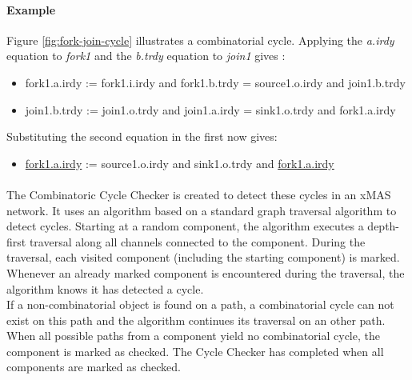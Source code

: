 \documentclass[a4paper,11pt]{article}
\begin{document}
\paragraph{Example}
Figure \ref{fig:fork-join-cycle} illustrates a combinatorial cycle. Applying the \emph{a.irdy} equation
to \emph{fork1} and the \emph{b.trdy} equation to \emph{join1} gives \cite[p.~44]{chatterjee10}:
\begin{itemize}
 \item fork1.a.irdy := fork1.i.irdy and fork1.b.trdy = source1.o.irdy and join1.b.trdy
 \item join1.b.trdy := join1.o.trdy and join1.a.irdy = sink1.o.trdy and fork1.a.irdy
\end{itemize}
Substituting the second equation in the first now gives:
\begin{itemize}
 \item \underline{fork1.a.irdy} := source1.o.irdy and sink1.o.trdy and \underline{fork1.a.irdy}
\end{itemize}







\paragraph{}
The Combinatoric Cycle Checker is created to detect these cycles in an xMAS network. It uses an
algorithm based on a standard graph traversal algorithm to detect cycles. Starting at a random
component, the algorithm executes a depth-first traversal along all channels connected to the
component. During the traversal, each visited component (including the starting component) is
marked. Whenever an already marked component is encountered during the traversal, the algorithm
knows it has detected a cycle.\\
If a non-combinatorial object is found on a path, a combinatorial cycle can not exist on this
path and the algorithm continues its traversal on an other path. When all possible paths from
a component yield no combinatorial cycle, the component is marked as checked. The Cycle Checker
has completed when all components are marked as checked.
\end{document}
